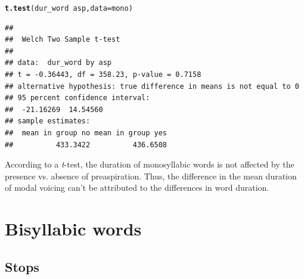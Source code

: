 \documentclass[a4paper,11pt]{article}\usepackage[]{graphicx}\usepackage[]{color}
\makeatletter
\newcommand{\hlopt}[1]{\textcolor[rgb]{0,0,0}{#1}}%
\newcommand{\hlstd}[1]{\textcolor[rgb]{0.345,0.345,0.345}{#1}}%
\newcommand{\hlkwc}[1]{\textcolor[rgb]{0.333,0.667,0.333}{#1}}%
\newcommand{\hlkwd}[1]{\textcolor[rgb]{0.737,0.353,0.396}{\textbf{#1}}}%
\newenvironment{kframe}{%
 \def\at@end@of@kframe{}%
 \ifinner\ifhmode%
  \def\at@end@of@kframe{\end{minipage}}%
  \begin{minipage}{\columnwidth}%
 \fi\fi%
 \def\FrameCommand##1{\hskip\@totalleftmargin \hskip-\fboxsep
 \colorbox{shadecolor}{##1}\hskip-\fboxsep
     \hskip-\linewidth \hskip-\@totalleftmargin \hskip\columnwidth}%
 \MakeFramed {\advance\hsize-\width
   \@totalleftmargin\z@ \linewidth\hsize
   \@setminipage}}%
 {\par\unskip\endMakeFramed%
 \at@end@of@kframe}
\newenvironment{knitrout}{}{} %
\makeatother
\begin{document}
\begin{knitrout}
\color{fgcolor}\begin{kframe}
\begin{alltt}
\hlkwd{t.test}\hlstd{(dur_word} \hlopt{~} \hlstd{asp,} \hlkwc{data} \hlstd{= mono)}
\end{alltt}
\begin{verbatim}
## 
## 	Welch Two Sample t-test
## 
## data:  dur_word by asp
## t = -0.36443, df = 358.23, p-value = 0.7158
## alternative hypothesis: true difference in means is not equal to 0
## 95 percent confidence interval:
##  -21.16269  14.54560
## sample estimates:
##  mean in group no mean in group yes 
##          433.3422          436.6508
\end{verbatim}
\end{kframe}
\end{knitrout}

According to a \textit{t}-test, the duration of monosyllabic words is not affected by the presence vs. absence of preaspiration.
Thus, the difference in the mean duration of modal voicing can't be attributed to the differences in word duration.

\section{Bisyllabic words}

\subsection{Stops}
\end{document}
